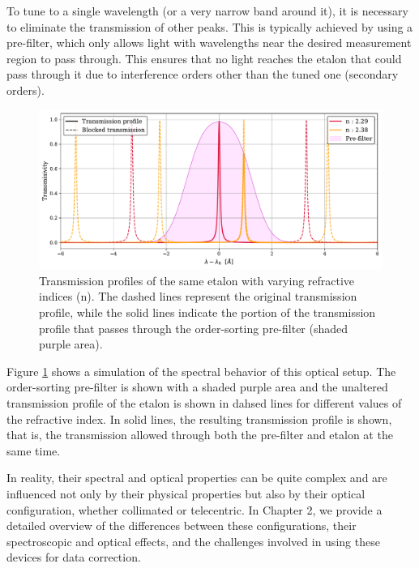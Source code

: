 \documentclass[12pt]{mythesis}
\begin{document}
To tune to a single wavelength (or a very narrow band around it), it is necessary to eliminate the transmission of other peaks. This is typically achieved by using a pre-filter, which only allows light with wavelengths near the desired measurement region to pass through. This ensures that no light reaches the etalon that could pass through it due to interference orders other than the tuned one (secondary orders). 

\begin{figure}
  \centering
  \includegraphics[width = \textwidth]{figures/Introduction_to_spectropolarimeters/Etalon_and_prefilter_example.pdf}
  \caption{Transmission profiles of the same etalon with varying refractive indices (n). The dashed lines represent the original transmission profile, while the solid lines indicate the portion of the transmission profile that passes through the order-sorting pre-filter (shaded purple area).} 
  \label{fig_ch2: etalon_example}
\end{figure}

Figure \ref{fig_ch2: etalon_example} shows a simulation of the spectral behavior of this optical setup. The order-sorting pre-filter is shown with a shaded purple area and the unaltered transmission profile of the etalon is shown in dahsed lines for different values of the refractive index. In solid lines, the resulting transmission profile is shown, that is, the transmission allowed through both the pre-filter and etalon at the same time. 

In reality, their spectral and optical properties can be quite complex and are influenced not only by their physical properties but also by their optical configuration, whether collimated or telecentric. In Chapter 2, we provide a detailed overview of the differences between these configurations, their spectroscopic and optical effects, and the challenges involved in using these devices for data correction.
\end{document}
